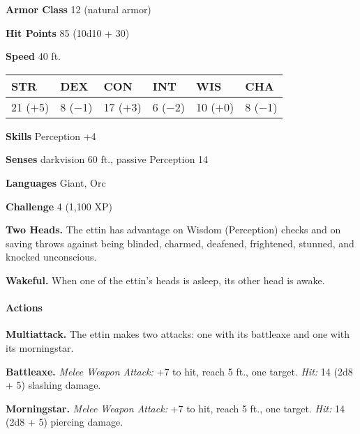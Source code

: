 \documentclass[
]{article}
\begin{document}
\textbf{Armor Class} 12 (natural armor)

\textbf{Hit Points} 85 (10d10 + 30)

\textbf{Speed} 40 ft.

\begin{longtable}[]{@{}llllll@{}}
\toprule
STR & DEX & CON & INT & WIS & CHA\tabularnewline
\midrule
\endhead
21 (+5) & 8 (−1) & 17 (+3) & 6 (−2) & 10 (+0) & 8 (−1)\tabularnewline
\bottomrule
\end{longtable}

\textbf{Skills} Perception +4

\textbf{Senses} darkvision 60 ft., passive Perception 14

\textbf{Languages} Giant, Orc

\textbf{Challenge} 4 (1,100 XP)

\textbf{Two Heads.} The ettin has advantage on Wisdom (Perception)
checks and on saving throws against being blinded, charmed, deafened,
frightened, stunned, and knocked unconscious.

\textbf{Wakeful.} When one of the ettin's heads is asleep, its other
head is awake.

\hypertarget{actions-6}{%
\paragraph{Actions}\label{actions-6}}

\textbf{Multiattack.} The ettin makes two attacks: one with its
battleaxe and one with its morningstar.

\textbf{Battleaxe.} \emph{Melee Weapon Attack:} +7 to hit, reach 5 ft.,
one target. \emph{Hit:} 14 (2d8 + 5) slashing damage.

\textbf{Morningstar.} \emph{Melee Weapon Attack:} +7 to hit, reach 5
ft., one target. \emph{Hit:} 14 (2d8 + 5) piercing damage.
\end{document}
